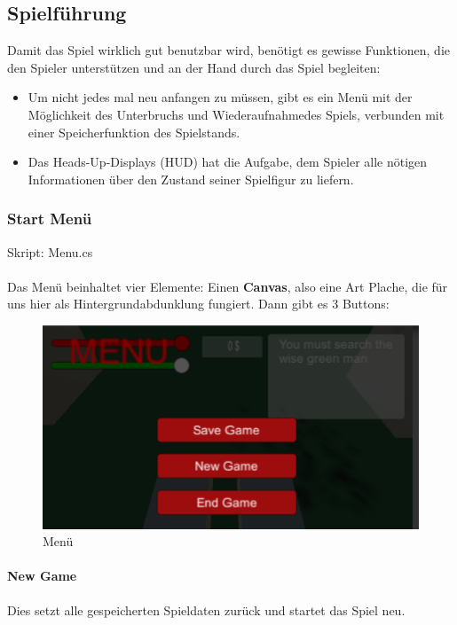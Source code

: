 \subsection{Spielführung}
Damit das Spiel wirklich gut benutzbar wird, benötigt es gewisse Funktionen, die den Spieler unterstützen und an der Hand durch das Spiel begleiten:
\begin{itemize}
\item Um nicht jedes mal neu anfangen zu müssen, gibt es ein Menü mit der Möglichkeit des Unterbruchs und Wiederaufnahmedes Spiels, verbunden mit einer Speicherfunktion des Spielstands.
\item Das Heads-Up-Displays (HUD) hat die Aufgabe, dem Spieler alle nötigen Informationen über den Zustand seiner Spielfigur zu liefern.
\end{itemize}

\subsubsection{Start Menü}
Skript: Menu.cs\\\\
Das Menü beinhaltet vier Elemente: Einen \textbf{Canvas}, also eine Art \glqq Plache\grqq, die für uns hier als Hintergrundabdunklung fungiert. Dann gibt es 3 Buttons:

\begin{figure}[H]
\includegraphics[scale=1]{screenshots/menuscreen.png}
\caption{Menü}
\end{figure}


\paragraph{New Game}
Dies setzt alle gespeicherten Spieldaten zurück und startet das Spiel neu.

